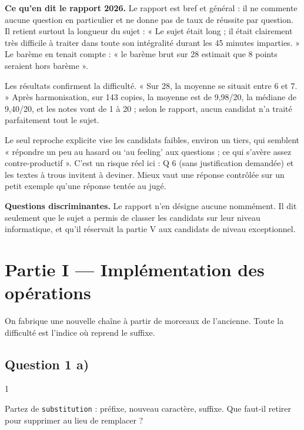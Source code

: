 \documentclass[11pt,a4paper]{article}
\begin{document}
\textbf{Ce qu'en dit le rapport 2026.} Le rapport est bref et général : il ne commente aucune question en particulier et ne donne pas de taux de réussite par question. Il retient surtout la longueur du sujet : « Le sujet était long ; il était clairement très difficile à traiter dans toute son intégralité durant les 45 minutes imparties. » Le barème en tenait compte : « le barème brut sur 28 estimait que 8 points seraient hors barème ».

Les résultats confirment la difficulté. « Sur 28, la moyenne se situait entre 6 et 7. » Après harmonisation, sur 143 copies, la moyenne est de 9,98/20, la médiane de 9,40/20, et les notes vont de 1 à 20 ; selon le rapport, aucun candidat n'a traité parfaitement tout le sujet.

Le seul reproche explicite vise les candidats faibles, environ un tiers, qui semblent « répondre un peu au hasard ou `au feeling' aux questions ; ce qui s'avère assez contre-productif ». C'est un risque réel ici : Q 6 (sans justification demandée) et les textes à trous invitent à deviner. Mieux vaut une réponse contrôlée sur un petit exemple qu'une réponse tentée au jugé.

\textbf{Questions discriminantes.} Le rapport n'en désigne aucune nommément. Il dit seulement que le sujet a permis de classer les candidats sur leur niveau informatique, et qu'il réservait la partie V aux candidats de niveau exceptionnel.

\hypertarget{partie-i-impluxe9mentation-des-opuxe9rations}{%
\section{Partie I --- Implémentation des opérations}\label{partie-i-impluxe9mentation-des-opuxe9rations}}

On fabrique une nouvelle chaîne à partir de morceaux de l'ancienne. Toute la difficulté est l'indice où reprend le suffixe.

\hypertarget{question-1-a}{%
\subsection{Question 1 a)}\label{question-1-a}}

\begin{indication}{1}

Partez de \texttt{substitution} : préfixe, nouveau caractère, suffixe. Que faut-il retirer pour supprimer au lieu de remplacer ?

\end{indication}
\end{document}
